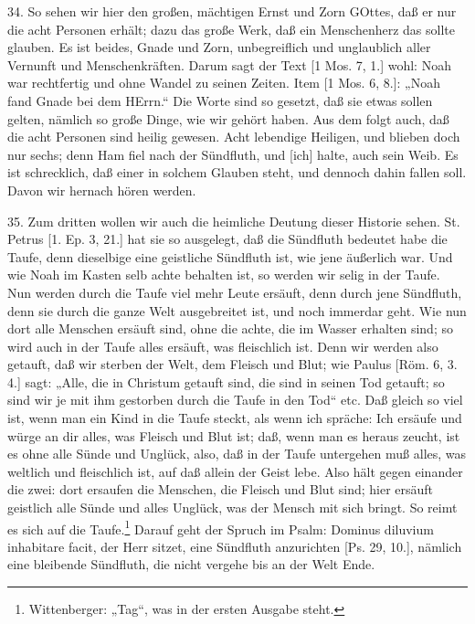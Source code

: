 34. So sehen wir hier den großen, mächtigen Ernst und Zorn GOttes, daß er nur die acht Personen erhält; dazu das große Werk, daß ein Menschenherz das sollte glauben. Es ist beides, Gnade und Zorn, unbegreiflich und unglaublich aller Vernunft und Menschenkräften. Darum sagt der Text [1 Mos. 7, 1.] wohl: Noah war rechtfertig und ohne Wandel zu seinen Zeiten. Item [1 Mos. 6, 8.]: „Noah fand Gnade bei dem HErrn.“ Die Worte sind so gesetzt, daß sie etwas sollen gelten, nämlich so große Dinge, wie wir gehört haben. Aus dem folgt auch, daß die acht Personen sind heilig gewesen. Acht lebendige Heiligen, und blieben doch nur sechs; denn Ham fiel nach der Sündfluth, und [ich] halte, auch sein Weib. Es ist schrecklich, daß einer in solchem Glauben steht, und dennoch dahin fallen soll. Davon wir hernach hören werden.

35. Zum dritten wollen wir auch die heimliche Deutung dieser Historie sehen. St. Petrus [1. Ep. 3, 21.] hat sie so ausgelegt, daß die Sündfluth bedeutet habe die Taufe, denn dieselbige eine geistliche Sündfluth ist, wie jene äußerlich war. Und wie Noah im Kasten selb achte behalten ist, so werden wir selig in der Taufe. Nun werden durch die Taufe viel mehr Leute ersäuft, denn durch jene Sündfluth, denn sie durch die ganze Welt ausgebreitet ist, und noch immerdar geht. Wie nun dort alle Menschen ersäuft sind, ohne die achte, die im Wasser erhalten sind; so wird auch in der Taufe alles ersäuft, was fleischlich ist. Denn wir werden also getauft, daß wir sterben der Welt, dem Fleisch und Blut; wie Paulus [Röm. 6, 3. 4.] sagt: „Alle, die in Christum getauft sind, die sind in seinen Tod getauft; so sind wir je mit ihm gestorben durch die Taufe in den Tod“ etc. Daß gleich so viel ist, wenn man ein Kind in die Taufe steckt, als wenn ich spräche: Ich ersäufe und würge an dir alles, was Fleisch und Blut ist; daß, wenn man es heraus zeucht, ist es ohne alle Sünde und Unglück, also, daß in der Taufe untergehen muß alles, was weltlich und fleischlich ist, auf daß allein der Geist lebe. Also hält gegen einander die zwei: dort ersaufen die Menschen, die Fleisch und Blut sind; hier ersäuft geistlich alle Sünde und alles Unglück, was der Mensch mit sich bringt. So reimt es sich auf die Taufe.\footnote{Wittenberger: „Tag“, was in der ersten Ausgabe steht.} Darauf geht der Spruch im Psalm: Dominus diluvium inhabitare facit,
der Herr sitzet, eine Sündfluth anzurichten [Ps. 29, 10.], nämlich eine bleibende Sündfluth, die nicht vergehe bis an der Welt Ende.

